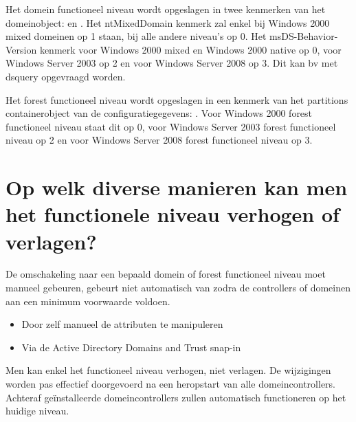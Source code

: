 Het domein functioneel niveau wordt opgeslagen in twee kenmerken van het
domeinobject:  en . Het
ntMixedDomain kenmerk zal enkel bij Windows 2000 mixed domeinen op 1 staan, bij
alle andere niveau's op 0. Het msDS-Behavior-Version kenmerk voor Windows 2000
mixed en Windows 2000 native op 0, voor Windows Server 2003 op 2 en voor Windows
Server 2008 op 3. Dit kan bv met dsquery opgevraagd worden.

Het forest functioneel niveau wordt opgeslagen in een kenmerk van het partitions
containerobject van de configuratiegegevens: .
Voor Windows 2000 forest functioneel niveau staat dit op 0, voor Windows Server
2003 forest functioneel niveau op 2 en voor Windows Server 2008 forest
functioneel niveau op 3.

\section{Op welk diverse manieren kan men het functionele niveau verhogen of
verlagen?}

De omschakeling naar een bepaald domein of forest functioneel niveau moet
manueel gebeuren, gebeurt niet automatisch van zodra de controllers of domeinen
aan een minimum voorwaarde voldoen.
\begin{itemize}
	\item Door zelf manueel de attributen te manipuleren
	\item Via de Active Directory Domains and Trust snap-in
\end{itemize}
Men kan enkel het functioneel niveau verhogen, niet verlagen. De wijzigingen
worden pas effectief doorgevoerd na een heropstart van alle domeincontrollers.
Achteraf geïnstalleerde domeincontrollers zullen automatisch functioneren op het
huidige niveau.
